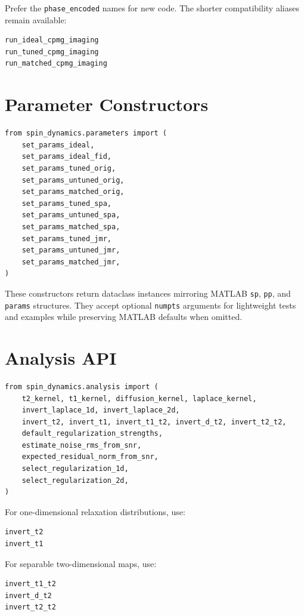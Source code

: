 \documentclass[11pt,oneside]{report}
\newcommand{\code}[1]{\texttt{#1}}
\begin{document}
Prefer the \code{phase\_encoded} names for new code. The shorter compatibility
aliases remain available:

\begin{lstlisting}
run_ideal_cpmg_imaging
run_tuned_cpmg_imaging
run_matched_cpmg_imaging
\end{lstlisting}

\section{Parameter Constructors}

\begin{lstlisting}
from spin_dynamics.parameters import (
    set_params_ideal,
    set_params_ideal_fid,
    set_params_tuned_orig,
    set_params_untuned_orig,
    set_params_matched_orig,
    set_params_tuned_spa,
    set_params_untuned_spa,
    set_params_matched_spa,
    set_params_tuned_jmr,
    set_params_untuned_jmr,
    set_params_matched_jmr,
)
\end{lstlisting}

These constructors return dataclass instances mirroring MATLAB \code{sp},
\code{pp}, and \code{params} structures. They accept optional \code{numpts}
arguments for lightweight tests and examples while preserving MATLAB defaults
when omitted.

\section{Analysis API}

\begin{lstlisting}
from spin_dynamics.analysis import (
    t2_kernel, t1_kernel, diffusion_kernel, laplace_kernel,
    invert_laplace_1d, invert_laplace_2d,
    invert_t2, invert_t1, invert_t1_t2, invert_d_t2, invert_t2_t2,
    default_regularization_strengths,
    estimate_noise_rms_from_snr,
    expected_residual_norm_from_snr,
    select_regularization_1d,
    select_regularization_2d,
)
\end{lstlisting}

For one-dimensional relaxation distributions, use:

\begin{lstlisting}
invert_t2
invert_t1
\end{lstlisting}

For separable two-dimensional maps, use:

\begin{lstlisting}
invert_t1_t2
invert_d_t2
invert_t2_t2
\end{lstlisting}
\end{document}
